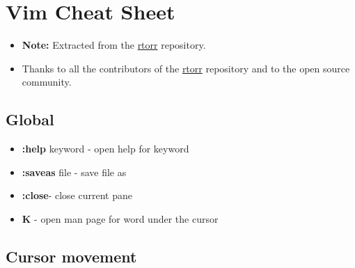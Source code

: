 \documentclass[twocolumn]{article}
\author{}
\date{}
\providecommand{\tightlist}{%
  \setlength{\itemsep}{0pt}\setlength{\parskip}{0pt}}
\begin{document}
\hypertarget{vim-cheat-sheet}{%
\section{Vim Cheat Sheet}\label{vim-cheat-sheet}}

\begin{itemize}
\item
  \textbf{Note:} Extracted from the
  \href{https://github.com/rtorr/vim-cheat-sheet}{rtorr} repository.
\item
  Thanks to all the contributors of the
  \href{https://github.com/rtorr/vim-cheat-sheet}{rtorr} repository and
  to the open source community.
\end{itemize}

\hypertarget{global}{%
\subsection{Global}\label{global}}

\begin{itemize}
\tightlist
\item
  \textbf{:help} keyword - open help for keyword
\item
  \textbf{:saveas} file - save file as
\item
  \textbf{:close}- close current pane
\item
  \textbf{K} - open man page for word under the cursor
\end{itemize}

\hypertarget{cursor-movement}{%
\subsection{Cursor movement}\label{cursor-movement}}
\end{document}

